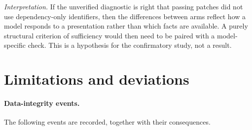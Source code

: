 \emph{Interpretation.} If the unverified diagnostic is right that passing patches did not use dependency-only identifiers, then the differences between arms reflect how a model responds to a presentation rather than which facts are available. A purely structural criterion of sufficiency would then need to be paired with a model-specific check. This is a hypothesis for the confirmatory study, not a result.

\section{Limitations and deviations}\label{sec:lim}

\paragraph{Data-integrity events.} The following events are recorded, together with their consequences.

